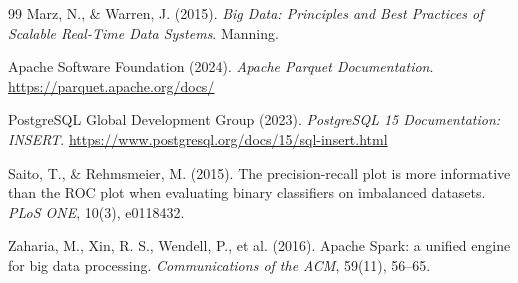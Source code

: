 \documentclass[11pt,a4paper]{article}
\begin{document}
\begin{thebibliography}{99}
Marz, N., \& Warren, J. (2015). \emph{Big Data: Principles and Best Practices of
Scalable Real-Time Data Systems}. Manning.

Apache Software Foundation (2024). \emph{Apache Parquet Documentation}.
\url{https://parquet.apache.org/docs/}

PostgreSQL Global Development Group (2023). \emph{PostgreSQL 15 Documentation:
INSERT}. \url{https://www.postgresql.org/docs/15/sql-insert.html}

Saito, T., \& Rehmsmeier, M. (2015). The precision-recall plot is more informative
than the ROC plot when evaluating binary classifiers on imbalanced datasets.
\emph{PLoS ONE}, 10(3), e0118432.

Zaharia, M., Xin, R. S., Wendell, P., et al. (2016). Apache Spark: a unified
engine for big data processing. \emph{Communications of the ACM}, 59(11), 56--65.

\end{thebibliography}
\end{document}

